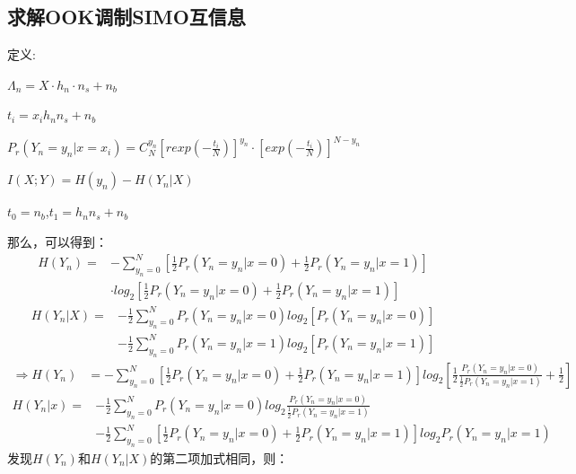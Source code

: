\documentclass[12pt]{article}
\begin{document}
\subsection{求解OOK调制SIMO互信息}
定义:\par$\Lambda_n=X·h_n·n_s+n_b$\par$t_i=x_ih_nn_s+n_b$\par$P_r(Y_n=y_n|x=x_i)=C_N^{y_n}\left[rexp\left(-\frac{t_i}{N}\right)\right]^{y_n}·\left[exp\left(-\frac{t_i}{N}\right)\right]^{N-y_n}$\par$I(X;Y)=H(y_n)-H(Y_n|X)$\par$t_0=n_b$,$t_1=h_nn_s+n_b$\par
那么，可以得到：
\begin{equation*}
    \begin{aligned}
      H(Y_n)=&-\sum\limits_{y_n=0}^N\left[\frac{1}{2}P_r(Y_n=y_n|x=0)+\frac{1}{2}P_r(Y_n=y_n|x=1)\right] \\
      &·log_2\left[\frac{1}{2}P_r(Y_n=y_n|x=0)+\frac{1}{2}P_r(Y_n=y_n|x=1)\right]
    \end{aligned}
\end{equation*}
\begin{equation*}
    \begin{aligned}
      H(Y_n|X)=&-\frac{1}{2}\sum\limits_{y_n=0}^NP_r(Y_n=y_n|x=0)log_2[P_r(Y_n=y_n|x=0)] \\
      &-\frac{1}{2}\sum\limits_{y_n=0}^NP_r(Y_n=y_n|x=1)log_2[P_r(Y_n=y_n|x=1)]
    \end{aligned}
\end{equation*}
\begin{equation*}
    \begin{aligned}
      \Rightarrow H(Y_n)&=-\sum\limits_{y_n=0}^N\left[\frac{1}{2}P_r(Y_n=y_n|x=0)+\frac{1}{2}P_r(Y_n=y_n|x=1)\right]log_2\left[\frac{1}{2}\frac{P_r(Y_n=y_n|x=0)}{\frac{1}{2}P_r(Y_n=y_n|x=1)}+\frac{1}{2}\right]
    \end{aligned}
\end{equation*}
\begin{equation*}
    \begin{aligned}
       H(Y_n|x)=&-\frac{1}{2}\sum\limits_{y_n=0}^NP_r(Y_n=y_n|x=0)log_2\frac{P_r(Y_n=y_n|x=0)}{\frac{1}{2}P_r(Y_n=y_n|x=1)}\\
       &-\frac{1}{2}\sum\limits_{y_n=0}^N\left[\frac{1}{2}P_r(Y_n=y_n|x=0)+\frac{1}{2}P_r(Y_n=y_n|x=1)\right]log_2P_r(Y_n=y_n|x=1)
    \end{aligned}
\end{equation*}
发现$H(Y_n)$和$H(Y_n|X)$的第二项加式相同，则：
\end{document}
